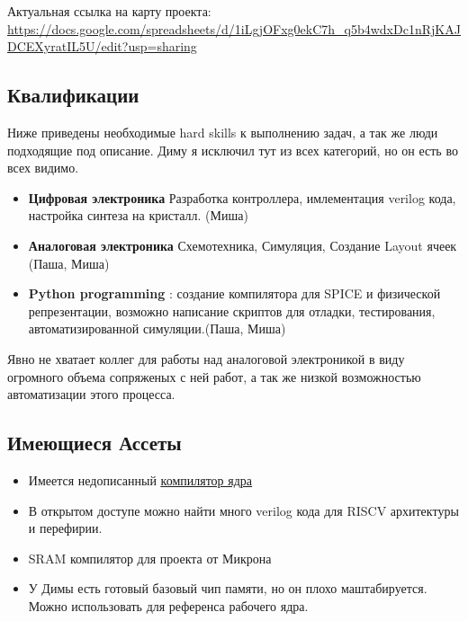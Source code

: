 \documentclass[a4paper,12pt]{article} %
\begin{document}
Актуальная ссылка на карту проекта:  \url {https://docs.google.com/spreadsheets/d/1iLgjOFxg0ekC7h_q5b4wdxDc1nRjKAJDCEXyratIL5U/edit?usp=sharing}



\subsection{Квалификации}

Ниже приведены необходимые  hard skills к выполнению задач, а так же люди подходящие под описание. Диму я исключил тут из всех категорий, но он есть во всех видимо.

\begin{itemize}
\item \textbf{Цифровая электроника} Разработка контроллера, имлементация verilog кода, настройка синтеза на кристалл. (Миша)
\item \textbf{Аналоговая электроника} Схемотехника, Симуляция, Создание Layout ячеек (Паша, Миша)
\item \textbf{Python programming} : создание компилятора для SPICE и физической репрезентации, возможно написание скриптов для отладки, тестирования, автоматизированной симуляции.(Паша, Миша)

\end{itemize}

Явно не хватает коллег для работы над аналоговой электроникой в виду огромного объема сопряженых с ней работ, а так же низкой возможностью автоматизации этого процесса.

\subsection{Имеющиеся Ассеты}

\begin{itemize}
\item Имеется недописанный \underline{\href{https://gitlab.com/mipt-ncs/nvram-gen}{компилятор ядра}}
\item В открытом доступе можно найти много verilog кода для RISCV архитектуры и перефирии.
\item SRAM компилятор для проекта от Микрона
\item У Димы есть готовый базовый чип памяти, но он плохо маштабируется. Можно использовать для референса  рабочего ядра. 


\end{itemize}
\end{document}
